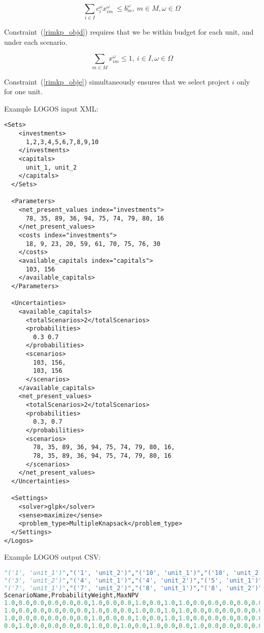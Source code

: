 \begin{equation}\label{rimkp_objd}
 \sum _{i \in I}^{} c_{i}^{ \omega }x_{im}^{ \omega }~  \leq  b_{m}^{ \omega },~ m \in M,  \omega  \in  \Omega
\end{equation}

Constraint~(\ref{rimkp_objd}) requires that we be within budget
for each unit, and under each scenario.

\begin{equation}\label{rimkp_obje}
\sum_{m\in M} x_{im}^{ \omega } \leq 1,~ i \in I, \omega  \in  \Omega
\end{equation}

Constraint~(\ref{rimkp_obje}) simultaneously ensures that we select project $i$
only for one unit.

Example LOGOS input XML:
\begin{lstlisting}[style=XML]
  <Sets>
    <investments>
      1,2,3,4,5,6,7,8,9,10
    </investments>
    <capitals>
      unit_1, unit_2
    </capitals>
  </Sets>

  <Parameters>
    <net_present_values index="investments">
      78, 35, 89, 36, 94, 75, 74, 79, 80, 16
    </net_present_values>
    <costs index="investments">
      18, 9, 23, 20, 59, 61, 70, 75, 76, 30
    </costs>
    <available_capitals index="capitals">
      103, 156
    </available_capitals>
  </Parameters>

  <Uncertainties>
    <available_capitals>
      <totalScenarios>2</totalScenarios>
      <probabilities>
        0.3 0.7
      </probabilities>
      <scenarios>
        103, 156,
        103, 156
      </scenarios>
    </available_capitals>
    <net_present_values>
      <totalScenarios>2</totalScenarios>
      <probabilities>
        0.3, 0.7
      </probabilities>
      <scenarios>
        78, 35, 89, 36, 94, 75, 74, 79, 80, 16,
        78, 35, 89, 36, 94, 75, 74, 79, 80, 16
      </scenarios>
    </net_present_values>
  </Uncertainties>

  <Settings>
    <solver>glpk</solver>
    <sense>maximize</sense>
    <problem_type>MultipleKnapsack</problem_type>
  </Settings>
</Logos>
\end{lstlisting}

Example LOGOS output CSV:
\begin{lstlisting}[basicstyle=\tiny,language=python]
"('1', 'unit_1')","('1', 'unit_2')","('10', 'unit_1')","('10', 'unit_2')","('2', 'unit_1')","('2', 'unit_2')","('3', 'unit_1')",
"('3', 'unit_2')","('4', 'unit_1')","('4', 'unit_2')","('5', 'unit_1')","('5', 'unit_2')","('6', 'unit_1')","('6', 'unit_2')",
"('7', 'unit_1')","('7', 'unit_2')","('8', 'unit_1')","('8', 'unit_2')","('9', 'unit_1')","('9', 'unit_2')",
ScenarioName,ProbabilityWeight,MaxNPV
1.0,0.0,0.0,0.0,0.0,0.0,1.0,0.0,0.0,1.0,0.0,1.0,1.0,0.0,0.0,0.0,0.0,0.0,0.0,1.0,scenario_1,0.09,452.0
1.0,0.0,0.0,0.0,0.0,0.0,1.0,0.0,0.0,1.0,0.0,1.0,1.0,0.0,0.0,0.0,0.0,0.0,0.0,1.0,scenario_2,0.21,452.0
1.0,0.0,0.0,0.0,0.0,0.0,1.0,0.0,0.0,1.0,0.0,1.0,1.0,0.0,0.0,0.0,0.0,0.0,0.0,1.0,scenario_3,0.21,452.0
0.0,1.0,0.0,0.0,0.0,0.0,1.0,0.0,1.0,0.0,1.0,0.0,0.0,1.0,0.0,0.0,0.0,0.0,0.0,1.0,scenario_4,0.49,452.0
\end{lstlisting}


